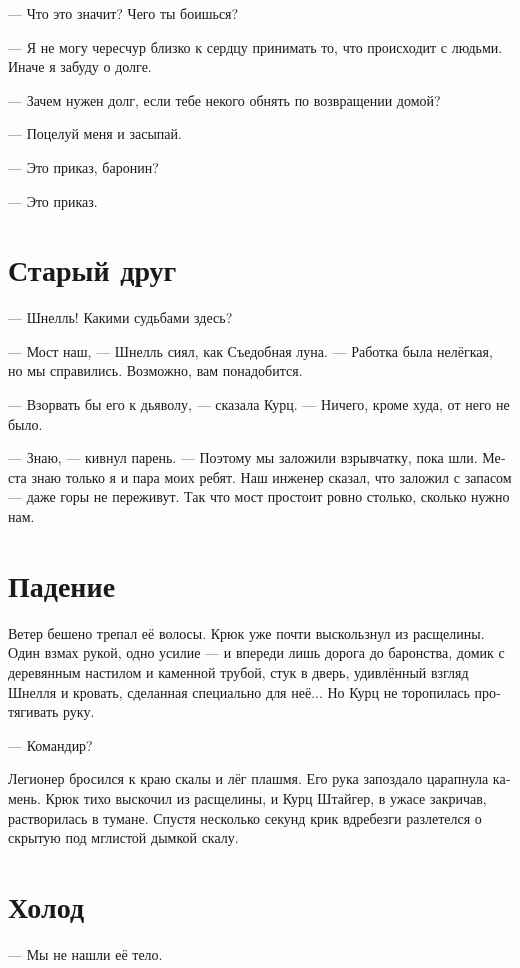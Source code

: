 \documentclass[a4paper,12pt,fleqn]{book}\usepackage{polyglossia}\setdefaultlanguage[babelshorthands=true]{russian}\setotherlanguage{english}\defaultfontfeatures{Ligatures=TeX,Mapping=tex-text}\usepackage{xcolor}\newcommand{\ml}[3]{#2}
\begin{document}
--- Что это значит?
Чего ты боишься?

--- Я не могу чересчур близко к сердцу принимать то, что происходит с людьми.
Иначе я забуду о долге.

--- Зачем нужен долг, если тебе некого обнять по возвращении домой?

--- Поцелуй меня и засыпай.

--- Это приказ, баронин?

--- Это приказ.

\section{Старый друг}

--- Шнелль!
Какими судьбами здесь?

--- Мост наш, --- Шнелль сиял, как Съедобная луна.
--- Работка была нелёгкая, но мы справились.
Возможно, вам понадобится.

--- Взорвать бы его к дьяволу, --- сказала Курц.
--- Ничего, кроме худа, от него не было.

--- Знаю, --- кивнул парень.
--- Поэтому мы заложили взрывчатку, пока шли.
Места знаю только я и пара моих ребят.
Наш инженер сказал, что заложил с запасом --- даже горы не переживут.
Так что мост простоит ровно столько, сколько нужно нам.

\section{Падение}

Ветер бешено трепал её волосы.
Крюк уже почти выскользнул из расщелины.
Один взмах рукой, одно усилие --- и впереди лишь дорога до баронства, домик с деревянным настилом и каменной трубой, стук в дверь, удивлённый взгляд Шнелля и кровать, сделанная специально для неё...
Но Курц не торопилась протягивать руку.

--- Командир?

Легионер бросился к краю скалы и лёг плашмя.
Его рука запоздало царапнула камень.
Крюк тихо выскочил из расщелины, и Курц Штайгер, в ужасе закричав, растворилась в тумане.
Спустя несколько секунд крик вдребезги разлетелся о скрытую под мглистой дымкой скалу. 

\section{Холод}

--- Мы не нашли её тело.
\end{document}
